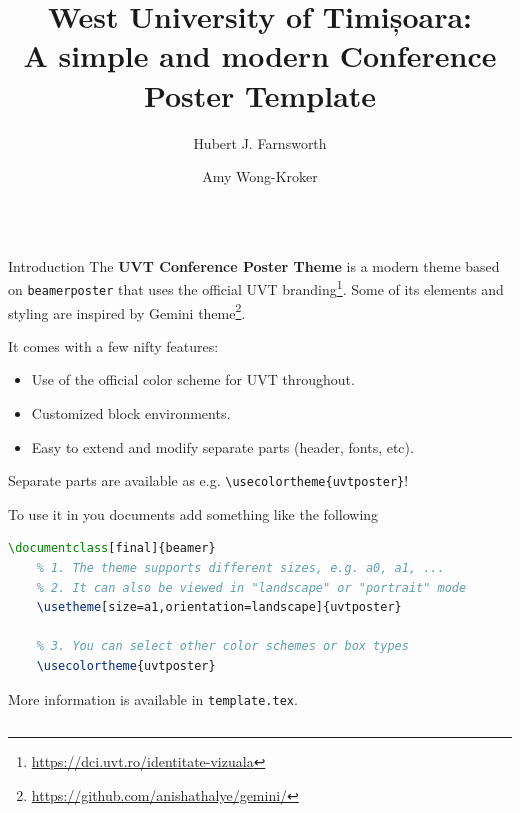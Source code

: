 \documentclass[final]{beamer}
\title{West University of Timișoara: \\ A simple and modern Conference Poster Template}
\author{Hubert J. Farnsworth\inst{1} \and Amy Wong-Kroker\inst{2}}
\institute[shortinst]{\inst{1} West University of Timișoara \quad \inst{2} Mars University}
\begin{document}
\begin{frame}[fragile]

\begin{columns}[t]

\separatorcolumn

\begin{column}{0.3\paperwidth}

\begin{block}{Introduction}
    The \textbf{UVT Conference Poster Theme} is a modern theme based on
    \texttt{beamerposter} that uses the official
    \textcolor{UVTLightBlue}{UVT branding}\footnote{\url{https://dci.uvt.ro/identitate-vizuala}}. Some
    of its elements and styling are inspired by \textcolor{UVTLightBlue}{Gemini}
    theme\footnote{\url{https://github.com/anishathalye/gemini/}}.

    \bigskip
    It comes with a few nifty features:
    \begin{itemize}
        \item Use of the official color scheme for UVT throughout.
        \item Customized block environments.
        \item Easy to extend and modify separate parts (header, fonts, etc).
    \end{itemize}

    \bigskip
    Separate parts are available as e.g. \texttt{\textbackslash usecolortheme\{uvtposter\}}!
    \bigskip

    To use it in you documents add something like the following

    \begin{center}
    \begin{lstlisting}[language=TeX]
    \documentclass[final]{beamer}
    % 1. The theme supports different sizes, e.g. a0, a1, ...
    % 2. It can also be viewed in "landscape" or "portrait" mode
    \usetheme[size=a1,orientation=landscape]{uvtposter}

    % 3. You can select other color schemes or box types
    \usecolortheme{uvtposter}
    \end{lstlisting}
    \end{center}

    \bigskip
    More information is available in \texttt{template.tex}.
    \bigskip
\end{block}


\end{column}
\end{columns}
\end{frame}
\end{document}
